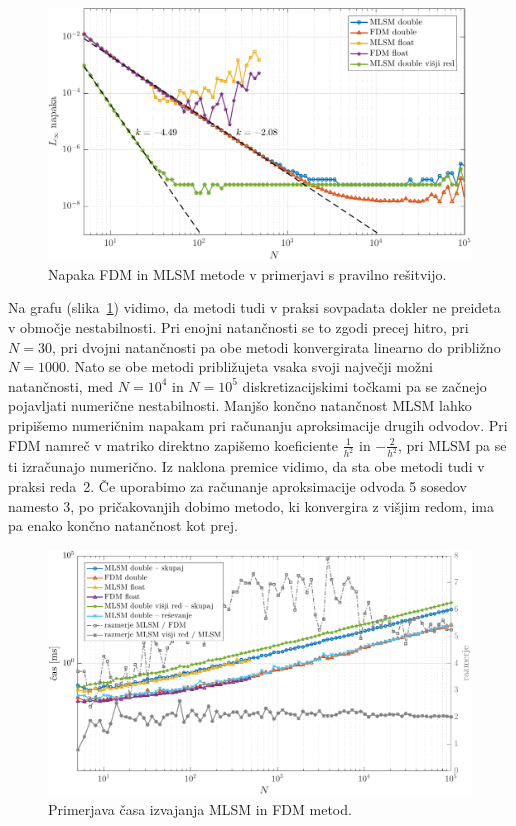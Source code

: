 \documentclass[12pt,a4paper,twoside]{article}
\theoremstyle{definition} %
\theoremstyle{plain} %
\numberwithin{equation}{section}
\newlength{\iw}
\begin{document}
\begin{figure}[h]
  \centering
  \includegraphics[width=\iw]{images/lap1d_convergence.pdf}
  \caption[Napaka FDM in MLSM metode.]{Napaka FDM in MLSM metode v primerjavi s pravilno rešitvijo.}
  \label{fig:mlsm-fdm-err}
\end{figure}

Na grafu (slika~\ref{fig:mlsm-fdm-err}) vidimo, da metodi tudi v praksi sovpadata dokler ne preideta
v območje nestabilnosti. Pri enojni natančnosti se to zgodi precej hitro, pri $N = 30$, pri dvojni
natančnosti pa obe metodi konvergirata linearno do približno $N = 1000$. Nato se obe metodi
približujeta vsaka svoji največji možni natančnosti, med $N = 10^4$ in $N = 10^5$ diskretizacijskimi
točkami pa se začnejo pojavljati numerične nestabilnosti. Manjšo končno natančnost MLSM lahko
pripišemo numeričnim napakam pri računanju aproksimacije drugih odvodov. Pri FDM namreč v matriko
direktno zapišemo koeficiente $\frac{1}{h^2}$ in $-\frac{2}{h^2}$, pri MLSM pa se ti izračunajo
numerično. Iz naklona premice vidimo, da sta obe metodi tudi v praksi reda~2. Če uporabimo za
računanje aproksimacije odvoda 5 sosedov namesto 3, po pričakovanjih dobimo metodo, ki konvergira z
višjim redom, ima pa enako končno natančnost kot prej.

\begin{figure}[h]
  \centering
  \includegraphics[width=\iw]{images/lap1d_times.pdf}
  \caption{Primerjava časa izvajanja MLSM in FDM metod.}
  \label{fig:mlsm-fdm-time}
\end{figure}
\end{document}
